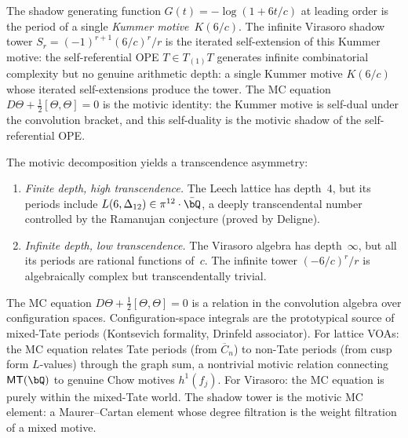 \begin{remark}%
\label{rem:kummer-motive}%
%
The shadow generating function $G(t) = -\log(1+6t/c)$ at leading
order is the period of a single \emph{Kummer motive}~$K(6/c)$.
The infinite Virasoro shadow tower
$S_r = (-1)^{r+1}(6/c)^r/r$ is the iterated self-extension of
this Kummer motive: the self-referential OPE $T \in T_{(1)}T$
generates infinite combinatorial complexity but no genuine
arithmetic depth: a single Kummer motive $K(6/c)$ whose
iterated self-extensions produce the tower.
The MC equation $D\Theta + \tfrac{1}{2}[\Theta,\Theta] = 0$ is
the motivic identity: the Kummer motive is self-dual under the
convolution bracket, and this self-duality is the motivic shadow
of the self-referential OPE.
\end{remark}

\begin{remark}%
\label{rem:transcendence-asymmetry}%
The motivic decomposition yields a transcendence asymmetry:
\begin{enumerate}[label=\textup{(\roman*)}]
\item \emph{Finite depth, high transcendence.}
 The Leech lattice has depth~$4$, but its periods include
 $L(6, \Delta_{12}) \in \pi^{12}\cdot\bar{\bQ}$, a
 deeply transcendental number controlled by the Ramanujan
 conjecture (proved by Deligne).
\item \emph{Infinite depth, low transcendence.}
 The Virasoro algebra has depth~$\infty$, but all its periods
 are rational functions of~$c$. The infinite tower
 $(-6/c)^r/r$ is algebraically complex but transcendentally
 trivial.
\end{enumerate}
\end{remark}

\begin{remark}%
\label{rem:mc-motivic-identity}%
The MC equation $D\Theta + \tfrac{1}{2}[\Theta,\Theta] = 0$
is a relation in the convolution algebra over configuration spaces.
Configuration-space integrals are the prototypical source of
mixed-Tate periods (Kontsevich formality, Drinfeld associator).
For lattice VOAs: the MC equation relates Tate periods (from
$\overline{C}_n$) to non-Tate periods (from cusp form
$L$-values) through the graph sum, a nontrivial motivic
relation connecting $\mathsf{MT}(\bQ)$ to genuine Chow
motives $h^1(f_j)$.
For Virasoro: the MC equation is purely within the
mixed-Tate world. The shadow tower is the
motivic MC element: a Maurer--Cartan element whose
degree filtration is the weight filtration of a mixed motive.
\end{remark}

